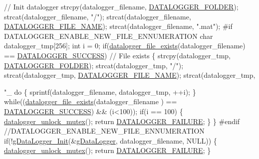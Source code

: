 \begin{DoxyCode}
        \textcolor{comment}{// Init datalogger}
    strcpy(datalogger\_filename, \hyperlink{datalogger_01_07Caio-PC's_01conflicted_01copy_012012-11-23_08_8h_a29791c024463d251eeab6973a0299e7b}{DATALOGGER\_FOLDER});
    strcat(datalogger\_filename, \textcolor{stringliteral}{"/"});
    strcat(datalogger\_filename, \hyperlink{datalogger_01_07Caio-PC's_01conflicted_01copy_012012-11-23_08_8h_a23bf1fb88a2adab92e7c477d927b241c}{DATALOGGER\_FILE\_NAME});
    strcat(datalogger\_filename, \textcolor{stringliteral}{".mat"});
\textcolor{preprocessor}{        #if DATALOGGER\_ENABLE\_NEW\_FILE\_ENNUMERATION}
\textcolor{preprocessor}{}    \textcolor{keywordtype}{char} datalogger\_tmp[256];
    \textcolor{keywordtype}{int} i = 0;
    \textcolor{keywordflow}{if}(\hyperlink{datalogger_01_07Caio-PC's_01conflicted_01copy_012012-11-23_08_8c_a29bc3190cba1f225ad3b2eed899a6762}{datalogger\_file\_exists}(datalogger\_filename) == 
      \hyperlink{datalogger_01_07Caio-PC's_01conflicted_01copy_012012-11-23_08_8h_abddebaf71d26d40183fccbb1a766b983}{DATALOGGER\_SUCCESS}) \textcolor{comment}{// File exists}
    \{
        strcpy(datalogger\_tmp, \hyperlink{datalogger_01_07Caio-PC's_01conflicted_01copy_012012-11-23_08_8h_a29791c024463d251eeab6973a0299e7b}{DATALOGGER\_FOLDER});
        strcat(datalogger\_tmp, \textcolor{stringliteral}{"/"});
        strcat(datalogger\_tmp, \hyperlink{datalogger_01_07Caio-PC's_01conflicted_01copy_012012-11-23_08_8h_a23bf1fb88a2adab92e7c477d927b241c}{DATALOGGER\_FILE\_NAME});
        strcat(datalogger\_tmp, \textcolor{stringliteral}{"\_%
        \textcolor{keywordflow}{do}
        \{
            sprintf(datalogger\_filename, datalogger\_tmp, ++i);
        \}
        \textcolor{keywordflow}{while}((\hyperlink{datalogger_01_07Caio-PC's_01conflicted_01copy_012012-11-23_08_8c_a29bc3190cba1f225ad3b2eed899a6762}{datalogger\_file\_exists}(datalogger\_filename
      ) == \hyperlink{datalogger_01_07Caio-PC's_01conflicted_01copy_012012-11-23_08_8h_abddebaf71d26d40183fccbb1a766b983}{DATALOGGER\_SUCCESS}) && (i<100));
        \textcolor{keywordflow}{if}(i == 100)
        \{
            \hyperlink{datalogger_01_07Caio-PC's_01conflicted_01copy_012012-11-23_08_8c_a85453211c0c809083c36cc56b275aeeb}{datalogger\_unlock\_mutex}();
            \textcolor{keywordflow}{return} \hyperlink{datalogger_01_07Caio-PC's_01conflicted_01copy_012012-11-23_08_8h_ac52138ca42979f6e1f1d589020ff9f83}{DATALOGGER\_FAILURE};
        \}
    \}
\textcolor{preprocessor}{        #endif //DATALOGGER\_ENABLE\_NEW\_FILE\_ENNUMERATION}
\textcolor{preprocessor}{}
    \textcolor{keywordflow}{if}(!\hyperlink{gdatalogger_8c_ab5eeb22d60836d57bae0dde821337045}{gDataLogger\_Init}(&\hyperlink{datalogger_01_07Caio-PC's_01conflicted_01copy_012012-11-23_08_8c_abe3b9c2c4e21e79c7b046b5986d13acc}{gDataLogger}, 
      datalogger\_filename, NULL))
    \{
        \hyperlink{datalogger_01_07Caio-PC's_01conflicted_01copy_012012-11-23_08_8c_a85453211c0c809083c36cc56b275aeeb}{datalogger\_unlock\_mutex}();
        \textcolor{keywordflow}{return} \hyperlink{datalogger_01_07Caio-PC's_01conflicted_01copy_012012-11-23_08_8h_ac52138ca42979f6e1f1d589020ff9f83}{DATALOGGER\_FAILURE};
    \}

}
\end{DoxyCode}
